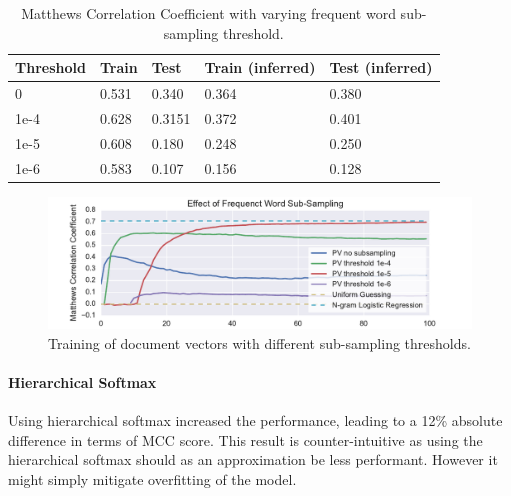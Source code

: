 \begin{table}[h]
  \begin{center}
  \begin{tabular}{ l | *4l }
    \toprule
    Threshold & Train & Test & Train (inferred) & Test (inferred) \\
    \midrule
    0 & 0.531 & 0.340 & 0.364 & 0.380 \\
    1e-4 & 0.628 & 0.3151 & 0.372 & 0.401 \\
    1e-5 & 0.608 & 0.180 & 0.248 & 0.250 \\
    1e-6 & 0.583& 0.107 & 0.156 & 0.128 \\
    \bottomrule
  \end{tabular}
  \caption{Matthews Correlation Coefficient with varying frequent word sub-sampling threshold.}
\label{tab:Paragraph Vector Parameter Results Sample}
\end{center}
\end{table}

\begin{figure}[h]
    \centering
    \includegraphics[width=\textwidth]{img/exp-vector-space-doc2vec-param-sample.pdf}
    \caption{Training of document vectors with different sub-sampling thresholds.}
  \label{fig:exp-vector-space-doc2vec-param-sample}
\end{figure}

\paragraph{Hierarchical Softmax}
Using hierarchical softmax increased the performance, leading to a 12\% absolute difference in terms of MCC score. This result is counter-intuitive as using the hierarchical softmax should as an approximation be less performant. However it might simply mitigate overfitting of the model.

